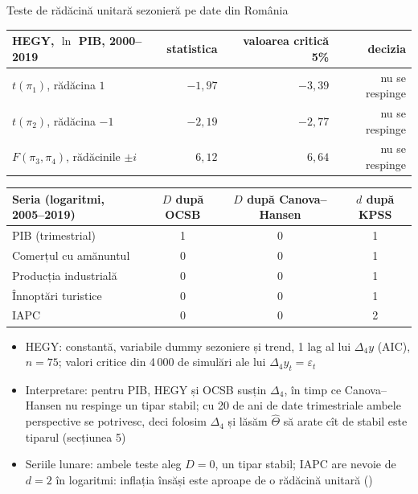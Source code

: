 \begin{frame}{Teste de rădăcină unitară sezonieră pe date din România}
\itemsize{\scriptsize}
\begin{center}
\scriptsize
\begin{tabular}{lrrr}
\toprule
\textbf{HEGY}, $\ln$ PIB, 2000--2019 & statistica & valoarea critică 5\% & decizia \\
\midrule
$t(\pi_1)$, rădăcina $1$ & $\ensuremath{-}1{,}97$ & $\ensuremath{-}3{,}39$ & nu se respinge \\
$t(\pi_2)$, rădăcina $-1$ & $\ensuremath{-}2{,}19$ & $\ensuremath{-}2{,}77$ & nu se respinge \\
$F(\pi_3, \pi_4)$, rădăcinile $\pm i$ & $6{,}12$ & $6{,}64$ & nu se respinge \\
\bottomrule
\end{tabular}
\end{center}
\begin{center}
\scriptsize
\begin{tabular}{lccc}
\toprule
\textbf{Seria} (logaritmi, 2005--2019) & $D$ după OCSB & $D$ după Canova--Hansen & $d$ după KPSS \\
\midrule
PIB (trimestrial) & 1 & 0 & 1 \\
Comerțul cu amănuntul & 0 & 0 & 1 \\
Producția industrială & 0 & 0 & 1 \\
Înnoptări turistice & 0 & 0 & 1 \\
IAPC & 0 & 0 & 2 \\
\bottomrule
\end{tabular}
\end{center}
\begin{itemize}
    \item HEGY: constantă, variabile dummy sezoniere și trend, 1 lag al lui $\Delta_4y$ (AIC), $n = 75$; valori critice din 4\,000 de simulări ale lui $\Delta_4y_t = \varepsilon_t$
    \item Interpretare: pentru PIB, HEGY și OCSB susțin $\Delta_4$, în timp ce Canova--Hansen nu respinge un tipar stabil; cu 20 de ani de date trimestriale ambele perspective se potrivesc, deci folosim $\Delta_4$ și lăsăm $\hat\Theta$ să arate cît de stabil este tiparul (secțiunea 5)
    \item Seriile lunare: ambele teste aleg $D = 0$, un tipar stabil; IAPC are nevoie de $d = 2$ în logaritmi: inflația însăși este aproape de o rădăcină unitară ()
\end{itemize}
\end{frame}

